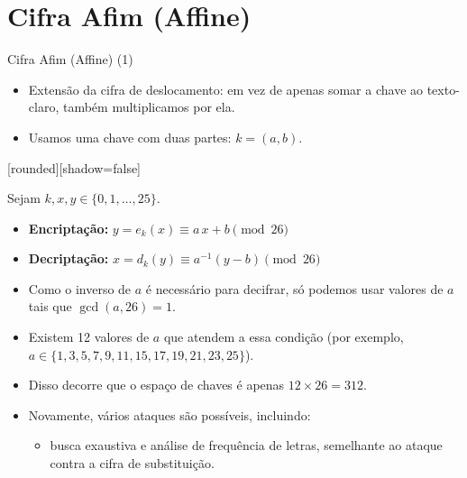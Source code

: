\documentclass{beamer}
\begin{document}
\section{Cifra Afim (Affine)}
\begin{frame}[t]{Cifra Afim (Affine) (1)}
\small %
\vspace{-1em}
\begin{itemize}\setlength{\itemsep}{0.35em}
  \item Extensão da cifra de deslocamento: em vez de apenas somar a chave ao texto-claro, também multiplicamos por ela.
  \item Usamos uma chave com duas partes: $k=(a,b)$.
\end{itemize}
\vspace{-0.9em}
{%
[rounded][shadow=false]
\begin{block}{}
Sejam $k, x, y \in \{0,1,\dots,25\}$.\\[-0.3em]
\begin{itemize}\setlength{\itemsep}{0.2em}
  \item \textbf{Encriptação:} \quad $y = e_k(x) \equiv a\,x + b \pmod{26}$
  \item \textbf{Decriptação:} \quad $x = d_k(y) \equiv a^{-1}(y - b) \pmod{26}$
\end{itemize}
\end{block}
}
\vspace{-0.25em}

\begin{itemize}\setlength{\itemsep}{0.35em}
  \item Como o inverso de $a$ é necessário para decifrar, só podemos usar valores de $a$ tais que $\gcd(a,26)=1$.
  \item Existem 12 valores de $a$ que atendem a essa condição (por exemplo, $a \in \{1,3,5,7,9,11,15,17,19,21,23,25\}$).
  \item Disso decorre que o espaço de chaves é apenas $12 \times 26 = 312$.
  \item Novamente, vários ataques são possíveis, incluindo:
  \begin{itemize}\setlength{\itemsep}{0.2em}
    \item busca exaustiva e análise de frequência de letras, semelhante ao ataque contra a cifra de substituição.
  \end{itemize}
\end{itemize}
\end{frame}
\end{document}
